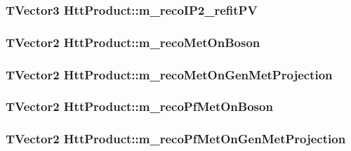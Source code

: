 \label{classHttProduct_afd8ea5060d1649bdc05b7598a43d3f30}
\hypertarget{classHttProduct_ab6f1595deb54f67149fdcc3a30adf7fa}{
\subsubsection[{m\_\-recoIP2\_\-refitPV}]{\setlength{\rightskip}{0pt plus 5cm}TVector3 {\bf HttProduct::m\_\-recoIP2\_\-refitPV}}}
\label{classHttProduct_ab6f1595deb54f67149fdcc3a30adf7fa}
\hypertarget{classHttProduct_abeb2d8eb1b290b609a225cef8616d021}{
\subsubsection[{m\_\-recoMetOnBoson}]{\setlength{\rightskip}{0pt plus 5cm}TVector2 {\bf HttProduct::m\_\-recoMetOnBoson}}}
\label{classHttProduct_abeb2d8eb1b290b609a225cef8616d021}
\hypertarget{classHttProduct_a9452803893bd2284d830ff46f52f606b}{
\subsubsection[{m\_\-recoMetOnGenMetProjection}]{\setlength{\rightskip}{0pt plus 5cm}TVector2 {\bf HttProduct::m\_\-recoMetOnGenMetProjection}}}
\label{classHttProduct_a9452803893bd2284d830ff46f52f606b}
\hypertarget{classHttProduct_abea8bb6a2a1f310bffeeed4e3c1828e9}{
\subsubsection[{m\_\-recoPfMetOnBoson}]{\setlength{\rightskip}{0pt plus 5cm}TVector2 {\bf HttProduct::m\_\-recoPfMetOnBoson}}}
\label{classHttProduct_abea8bb6a2a1f310bffeeed4e3c1828e9}
\hypertarget{classHttProduct_a14c6dc367cae8ab8dfec16d20180cd8d}{
\subsubsection[{m\_\-recoPfMetOnGenMetProjection}]{\setlength{\rightskip}{0pt plus 5cm}TVector2 {\bf HttProduct::m\_\-recoPfMetOnGenMetProjection}}}
